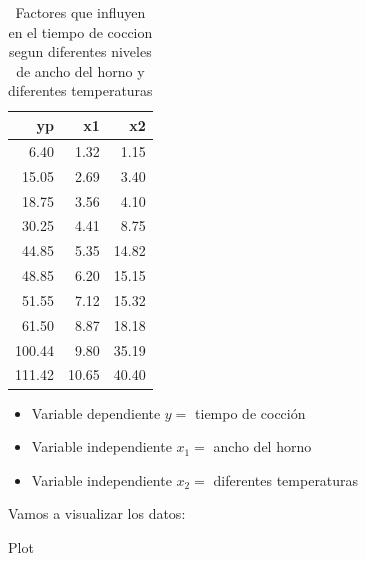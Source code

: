 \documentclass[
]{book}
\begin{document}
\begin{table}

\caption{\label{tab:unnamed-chunk-40}Factores que influyen en el tiempo de coccion segun diferentes niveles de ancho del horno y diferentes temperaturas}
\centering
\begin{tabular}[t]{r|r|r}
\hline
yp & x1 & x2\\
\hline
6.40 & 1.32 & 1.15\\
\hline
15.05 & 2.69 & 3.40\\
\hline
18.75 & 3.56 & 4.10\\
\hline
30.25 & 4.41 & 8.75\\
\hline
44.85 & 5.35 & 14.82\\
\hline
48.85 & 6.20 & 15.15\\
\hline
51.55 & 7.12 & 15.32\\
\hline
61.50 & 8.87 & 18.18\\
\hline
100.44 & 9.80 & 35.19\\
\hline
111.42 & 10.65 & 40.40\\
\hline
\end{tabular}
\end{table}

\begin{itemize}
\item
  Variable dependiente \(y =\) tiempo de cocción
\item
  Variable independiente \(x_1 =\) ancho del horno
\item
  Variable independiente \(x_2 =\) diferentes temperaturas
\end{itemize}

Vamos a visualizar los datos:

Plot
\end{document}
